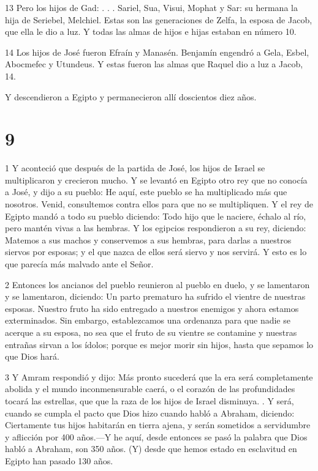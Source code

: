 \par 13 Pero los hijos de Gad: . . . Sariel, Sua, Visui, Mophat y Sar: su hermana la hija de Seriebel, Melchiel. Estas son las generaciones de Zelfa, la esposa de Jacob, que ella le dio a luz. Y todas las almas de hijos e hijas estaban en número 10.

\par 14 Los hijos de José fueron Efraín y Manasén. Benjamín engendró a Gela, Esbel, Abocmefec y Utundeus. Y estas fueron las almas que Raquel dio a luz a Jacob, 14.

Y descendieron a Egipto y permanecieron allí doscientos diez años.

\chapter{9}

\par 1 Y aconteció que después de la partida de José, los hijos de Israel se multiplicaron y crecieron mucho. Y se levantó en Egipto otro rey que no conocía a José, y dijo a su pueblo: He aquí, este pueblo se ha multiplicado más que nosotros. Venid, consultemos contra ellos para que no se multipliquen. Y el rey de Egipto mandó a todo su pueblo diciendo: Todo hijo que le naciere, échalo al río, pero mantén vivas a las hembras. Y los egipcios respondieron a su rey, diciendo: Matemos a sus machos y conservemos a sus hembras, para darlas a nuestros siervos por esposas; y el que nazca de ellos será siervo y nos servirá. Y esto es lo que parecía más malvado ante el Señor.

\par 2 Entonces los ancianos del pueblo reunieron al pueblo en duelo, y se lamentaron y se lamentaron, diciendo: Un parto prematuro ha sufrido el vientre de nuestras esposas. Nuestro fruto ha sido entregado a nuestros enemigos y ahora estamos exterminados. Sin embargo, establezcamos una ordenanza para que nadie se acerque a su esposa, no sea que el fruto de su vientre se contamine y nuestras entrañas sirvan a los ídolos; porque es mejor morir sin hijos, hasta que sepamos lo que Dios hará.

\par 3 Y Amram respondió y dijo: Más pronto sucederá que la era será completamente abolida y el mundo inconmensurable caerá, o el corazón de las profundidades tocará las estrellas, que que la raza de los hijos de Israel disminuya. . Y será, cuando se cumpla el pacto que Dios hizo cuando habló a Abraham, diciendo: Ciertamente tus hijos habitarán en tierra ajena, y serán sometidos a servidumbre y aflicción por 400 años.—Y he aquí, desde entonces se pasó la palabra que Dios habló a Abraham, son 350 años. (Y) desde que hemos estado en esclavitud en Egipto han pasado 130 años.

